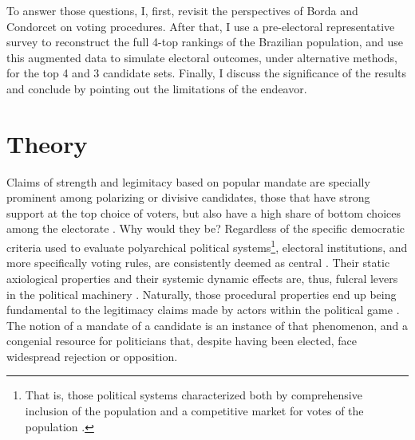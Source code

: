\documentclass[hidelinks,11pt]{article}
\begin{document}
To answer those questions, I, first, revisit the perspectives of Borda and
Condorcet on voting procedures. After that, I use a pre-electoral representative
survey to reconstruct the full 4-top rankings of the Brazilian population, and
use this augmented data to simulate electoral outcomes, under alternative
methods, for the top 4 and 3 candidate sets. Finally, I discuss the significance
of the results and conclude by pointing out the limitations of the endeavor.

\section{Theory}


Claims of strength and legimitacy based on popular mandate are specially
prominent among polarizing or divisive candidates, those that have strong
support at the top choice of voters, but also have a high share of bottom
choices among the electorate \parencite{igersheim22_compar_votin_method}. Why
would they be? Regardless of the specific democratic criteria used to evaluate
polyarchical political systems\footnote{That is, those political systems
  characterized both by comprehensive inclusion of the population and a
  competitive market for votes of the population
  \parencite{dahl1989democracy}.}, electoral institutions, and more specifically
voting rules, are consistently deemed as central
\parencite{riker1982liberalism}. Their static axiological properties and their
systemic dynamic effects are, thus, fulcral levers in the political machinery
\parencite{Wange2021systems, felsenthal2011review, nurmi1999voting}. Naturally,
those procedural properties end up being fundamental to the legitimacy claims
made by actors within the political game \parencite{patty2014social}. The notion
of a mandate of a candidate is an instance of that phenomenon, and a congenial
resource for politicians that, despite having been elected, face widespread
rejection or opposition.
\end{document}
